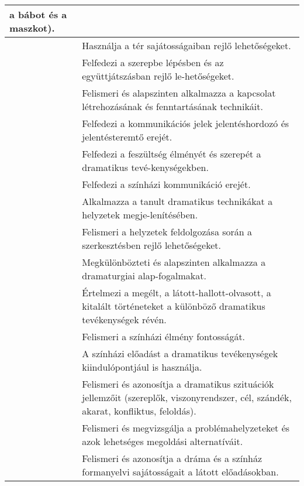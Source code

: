 \begin{longtable}[]{p{\evflength}@{\strut}>{\begin{minipage}{\columnlength}\strut}l<{\strut\end{minipage}}}
  a bábot és a maszkot).
\tabularnewline
\hline
&
  Használja a tér sajátosságaiban rejlő lehetőségeket.
\tabularnewline
\hline
&
  Felfedezi a szerepbe lépésben és az együttjátszásban rejlő
  le-\break hetőségeket.
\tabularnewline
\hline
&
  Felismeri és alapszinten alkalmazza a kapcsolat létrehozásának és
  fenntartásának technikáit.
\tabularnewline
\hline
&
  Felfedezi a kommunikációs jelek jelentéshordozó és jelentésteremtő
  erejét.
\tabularnewline
\hline
&
  Felfedezi a feszültség élményét és szerepét a dramatikus
  tevé-\break kenységekben.
\tabularnewline
\hline
&
  Felfedezi a színházi kommunikáció erejét.
\tabularnewline
\hline
&
  Alkalmazza a tanult dramatikus technikákat a helyzetek
  megje-\break lenítésében.
\tabularnewline
\hline
&
  Felismeri a helyzetek feldolgozása során a szerkesztésben rejlő
  lehetőségeket.
\tabularnewline
\hline
&
  Megkülönbözteti és alapszinten alkalmazza a dramaturgiai
  alap-\break fogalmakat.
\tabularnewline
\hline
&
  Értelmezi a megélt, a látott-hallott-olvasott, a kitalált történeteket
  a különböző dramatikus tevékenységek révén.
\tabularnewline
\hline
&
  Felismeri a színházi élmény fontosságát.
\tabularnewline
\hline
&
  A színházi előadást a dramatikus tevékenységek kiindulópontjául is
  használja.
\tabularnewline
\hline
&
  Felismeri és azonosítja a dramatikus szituációk jellemzőit (szereplők,
  viszonyrendszer, cél, szándék, akarat, konfliktus, feloldás).
\tabularnewline
\hline
&
  Felismeri és megvizsgálja a problémahelyzeteket és azok lehetséges
  megoldási alternatíváit.
\tabularnewline
\hline
&
  Felismeri és azonosítja a dráma és a színház formanyelvi sajátosságait
  a látott előadásokban.
\tabularnewline
\hline
\end{longtable}


\settowidth{\evflength}{\usebox{\evfbox}}
\setlength{\columnlength}{\textwidth}
\addtolength{\columnlength}{-\evflength}

